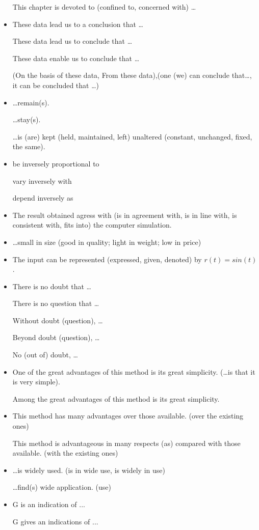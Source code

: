 \documentclass[a4paper,twocolumn,10pt]{article}
\begin{document}
\begin{CJK}{UTF8}{gkai}
\begin{itemize}
	This chapter is devoted to (confined to, concerned with) \ldots
\item
	These data lead us to a conclusion that \ldots

	These data lead us to conclude that \ldots

	These data enable us to conclude that \ldots

	(On the basis of these data, From these data),(one (we) can conclude that\ldots, it can be concluded that \ldots)
\item
	\ldots remain(s).
	
	\ldots stay(s).

	\ldots is (are) kept (held, maintained, left) unaltered (constant, unchanged, fixed, the same).
\item
	be inversely proportional to

	vary inversely with

	depend inversely as
\item
	The result obtained agress with (is in agreement with, is in line with, is consistent with, fits into) the computer simulation.
\item
	\ldots small in size (good in quality; light in weight; low in price)
\item
	The input can be represented (expressed, given, denoted) by $r(t) = sin(t)$.
\item
	There is no doubt that \ldots

	There is no question that \ldots

	Without doubt (question), \ldots

	Beyond doubt (question), \ldots

	No (out of) doubt, \ldots
\item
	One of the great advantages of this method is its great simplicity. (\ldots is that it is very simple).

	Among the great advantages of this method is its great simplicity.
\item
	This method has many advantages over those available. (over the existing ones)

	This method is advantageous in many respects (as) compared with those available. (with the existing ones)
\item
	\ldots is widely used. (is in wide use, is widely in use)
	
	\ldots find(s) wide application. (use)
\item
	G is an indication of ...

	G gives an indications of ...


\end{itemize}
\end{CJK}
\end{document}
